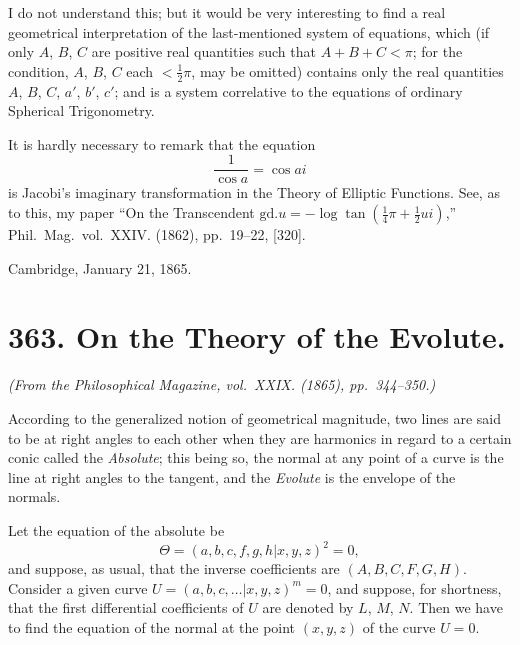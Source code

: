 \documentclass[11pt,a4paper]{article}
\theoremstyle{plain}
\begin{document}
I do not understand this; but it would be very interesting to find a real geometrical interpretation of the last-mentioned system of equations, which (if only $A$, $B$, $C$ are positive real quantities such that $A + B + C < \pi$; for the condition, $A$, $B$, $C$ each $< \frac12\pi$, may be omitted) contains only the real quantities $A$, $B$, $C$, $a'$, $b'$, $c'$; and is a system correlative to the equations of ordinary Spherical Trigonometry.

It is hardly necessary to remark that the equation
\[
\frac{1}{\cos a} = \cos ai
\]
is Jacobi's imaginary transformation in the Theory of Elliptic Functions. See, as to this, my paper ``On the Transcendent $\mathrm{gd}.u = -\log \tan(\frac14\pi + \tfrac12ui)$,'' Phil.\ Mag.\ vol.~XXIV. (1862), pp.~19--22, [320].

\begin{flushright}
Cambridge, January 21, 1865.
\end{flushright}

\vspace{1cm}

\section*{363. On the Theory of the Evolute.\quad [363]}
\label{sec:363}

\begin{flushright}
\textit{(From the Philosophical Magazine, vol.~XXIX. (1865), pp.~344--350.)}
\end{flushright}

According to the generalized notion of geometrical magnitude, two lines are said to be at right angles to each other when they are harmonics in regard to a certain conic called the \textit{Absolute}; this being so, the normal at any point of a curve is the line at right angles to the tangent, and the \textit{Evolute} is the envelope of the normals.

Let the equation of the absolute be
\[
\Theta = (a, b, c, f, g, h  |  x, y, z)^2 = 0,
\]
and suppose, as usual, that the inverse coefficients are $(A, B, C, F, G, H)$. Consider a given curve $U = (a, b, c, \ldots  |  x, y, z)^m = 0$, and suppose, for shortness, that the first differential coefficients of $U$ are denoted by $L$, $M$, $N$. Then we have to find the equation of the normal at the point $(x, y, z)$ of the curve $U = 0$.
\end{document}
